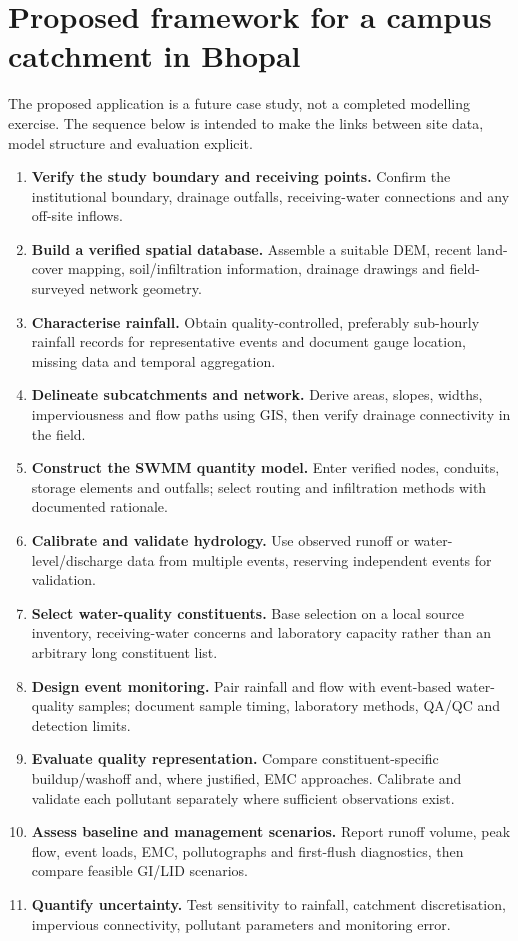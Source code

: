 \documentclass[journal]{IEEEtran}
\begin{document}
\section{Proposed framework for a campus catchment in Bhopal}
The proposed application is a future case study, not a completed modelling exercise. The sequence below is intended to make the links between site data, model structure and evaluation explicit.

\begin{enumerate}[leftmargin=1.5em]
  \item \textbf{Verify the study boundary and receiving points.} Confirm the institutional boundary, drainage outfalls, receiving-water connections and any off-site inflows.
  \item \textbf{Build a verified spatial database.} Assemble a suitable DEM, recent land-cover mapping, soil/infiltration information, drainage drawings and field-surveyed network geometry.
  \item \textbf{Characterise rainfall.} Obtain quality-controlled, preferably sub-hourly rainfall records for representative events and document gauge location, missing data and temporal aggregation.
  \item \textbf{Delineate subcatchments and network.} Derive areas, slopes, widths, imperviousness and flow paths using GIS, then verify drainage connectivity in the field.
  \item \textbf{Construct the SWMM quantity model.} Enter verified nodes, conduits, storage elements and outfalls; select routing and infiltration methods with documented rationale.
  \item \textbf{Calibrate and validate hydrology.} Use observed runoff or water-level/discharge data from multiple events, reserving independent events for validation.
  \item \textbf{Select water-quality constituents.} Base selection on a local source inventory, receiving-water concerns and laboratory capacity rather than an arbitrary long constituent list.
  \item \textbf{Design event monitoring.} Pair rainfall and flow with event-based water-quality samples; document sample timing, laboratory methods, QA/QC and detection limits.
  \item \textbf{Evaluate quality representation.} Compare constituent-specific buildup/washoff and, where justified, EMC approaches. Calibrate and validate each pollutant separately where sufficient observations exist.
  \item \textbf{Assess baseline and management scenarios.} Report runoff volume, peak flow, event loads, EMC, pollutographs and first-flush diagnostics, then compare feasible GI/LID scenarios.
  \item \textbf{Quantify uncertainty.} Test sensitivity to rainfall, catchment discretisation, impervious connectivity, pollutant parameters and monitoring error.
\end{enumerate}
\end{document}
